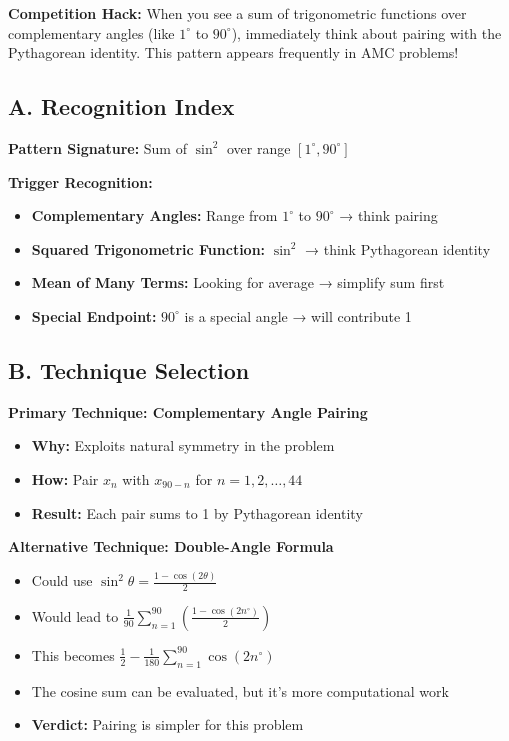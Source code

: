 \documentclass[12pt]{article}
\begin{document}
\vspace{1em}

\begin{protipbox}
\textbf{Competition Hack:} When you see a sum of trigonometric functions over complementary angles (like $1^{\circ}$ to $90^{\circ}$), immediately think about pairing with the Pythagorean identity. This pattern appears frequently in AMC problems!
\end{protipbox}

\vspace{1em}

\begin{techniquesbox}
\subsection*{A. Recognition Index}

\textbf{Pattern Signature:} Sum of $\sin^2$ over range $[1^{\circ}, 90^{\circ}]$

\textbf{Trigger Recognition:}
\begin{itemize}
    \item \textbf{Complementary Angles:} Range from $1^{\circ}$ to $90^{\circ}$ → think pairing
    \item \textbf{Squared Trigonometric Function:} $\sin^2$ → think Pythagorean identity
    \item \textbf{Mean of Many Terms:} Looking for average → simplify sum first
    \item \textbf{Special Endpoint:} $90^{\circ}$ is a special angle → will contribute 1
\end{itemize}

\subsection*{B. Technique Selection}

\textbf{Primary Technique: Complementary Angle Pairing}
\begin{itemize}
    \item \textbf{Why:} Exploits natural symmetry in the problem
    \item \textbf{How:} Pair $x_n$ with $x_{90-n}$ for $n = 1, 2, \ldots, 44$
    \item \textbf{Result:} Each pair sums to 1 by Pythagorean identity
\end{itemize}

\textbf{Alternative Technique: Double-Angle Formula}
\begin{itemize}
    \item Could use $\sin^2\theta = \frac{1 - \cos(2\theta)}{2}$
    \item Would lead to $\frac{1}{90}\sum_{n=1}^{90}\left(\frac{1 - \cos(2n^{\circ})}{2}\right)$
    \item This becomes $\frac{1}{2} - \frac{1}{180}\sum_{n=1}^{90}\cos(2n^{\circ})$
    \item The cosine sum can be evaluated, but it's more computational work
    \item \textbf{Verdict:} Pairing is simpler for this problem
\end{itemize}


\end{techniquesbox}
\end{document}
